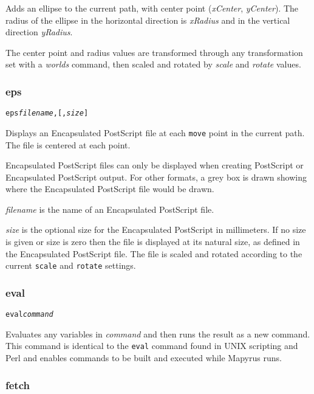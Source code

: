 Adds an ellipse to the current path, with center
point (\textit{xCenter}, \textit{yCenter}).  The radius of the ellipse
in the horizontal direction is \textit{xRadius} and in the vertical
direction \textit{yRadius}.

The center point and radius values are transformed through any
transformation set with a \textit{worlds} command,
then scaled and rotated by \textit{scale}
and \textit{rotate} values.

\subsubsection{eps}

\begin{alltt}
eps \textit{filename}, [, \textit{size}]
\end{alltt}

Displays an Encapsulated PostScript file at each \texttt{move} point in
the current path.  The file is centered at each point.

Encapsulated PostScript files can only be displayed when creating
PostScript or Encapsulated PostScript output.  For other formats,
a grey box is drawn showing where the Encapsulated PostScript file
would be drawn.

\textit{filename} is the name of an Encapsulated PostScript file.

\textit{size} is the optional size for the Encapsulated PostScript
in millimeters.  If no size
is given or size is zero then the file is displayed at its natural size,
as defined in the Encapsulated PostScript file.
The file is scaled and rotated according to the current \texttt{scale}
and \texttt{rotate} settings.

\subsubsection{eval}

\begin{alltt}
eval \textit{command}
\end{alltt}

Evaluates any variables in \textit{command} and then
runs the result as a new command.
This command is identical to the \texttt{eval} command found in
UNIX scripting and Perl and
enables commands to be built and executed while Mapyrus runs.

\subsubsection{fetch}

